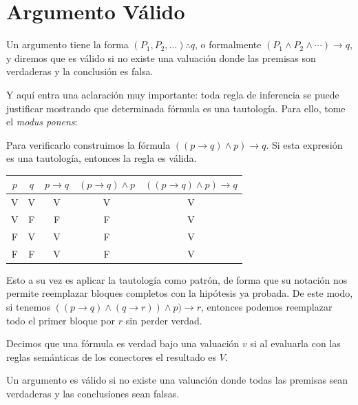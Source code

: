   \section{Argumento Válido}

  \begin{definition}[title={Argumento}]
  Un argumento tiene la forma $(P_1, P_2, \ldots) \therefore q$, o
  formalmente $(P_1 \land P_2 \land \cdots) \to q$, y diremos que es
  válido si no existe una valuación donde las premisas son verdaderas y
  la conclusión es falsa.
  \end{definition}

  Y aquí entra una aclaración muy importante: toda regla de inferencia se
  puede justificar mostrando que determinada fórmula es una tautología.
  Para ello, tome el \textit{modus ponens}:

  Para verificarlo construimos la fórmula $((p \to q) \land p) \to q$.
  Si esta expresión es una tautología, entonces la regla es válida.

  \begin{tabular}{c|c|c|c|c}
  $p$ & $q$ & $p \to q$ & $(p \to q) \land p$ & $((p \to q) \land p) \to q$ \\
  \hline
  V & V & V & V & V \\
  V & F & F & F & V \\
  F & V & V & F & V \\
  F & F & V & F & V \\
  \end{tabular}

  Esto a su vez es aplicar la tautología como patrón, de forma que su
  notación nos permite reemplazar bloques completos con la hipótesis ya
  probada. De este modo, si tenemos
  $((p \to q) \land (q \to r)) \land p) \to r$, entonces podemos
  reemplazar todo el primer bloque por $r$ sin perder verdad.

  \begin{definition}[title={Verdad bajo valuación}]
  Decimos que una fórmula es verdad bajo una valuación $v$ si al
  evaluarla con las reglas semánticas de los conectores el resultado es $V$.
  \end{definition}

  \begin{definition}[title={Argumento válido}]
  Un argumento es válido si no existe una valuación donde todas las
  premisas sean verdaderas y las conclusiones sean falsas.
  \end{definition}